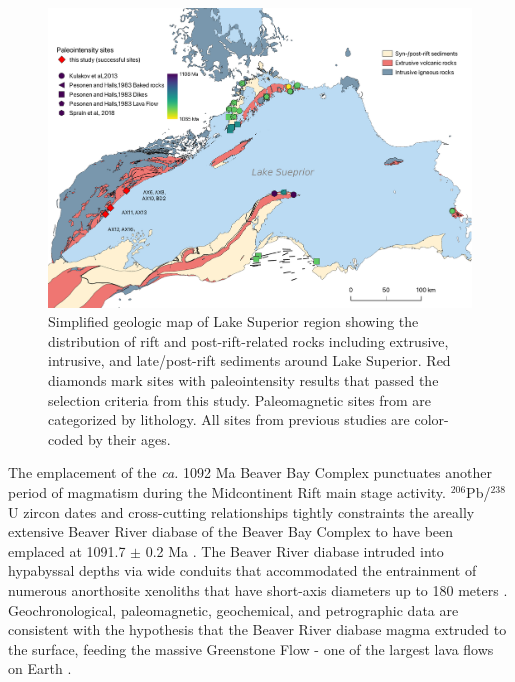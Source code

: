 \documentclass[draft]{agujournal2019}
\begin{document}
\begin{figure}
\centering
\noindent\includegraphics[width=\textwidth]{Geologic_map.pdf}
\caption{\footnotesize{Simplified geologic map of Lake Superior region showing the distribution of rift and post-rift-related rocks including extrusive, intrusive, and late/post-rift sediments around Lake Superior. Red diamonds mark sites with paleointensity results that passed the selection criteria from this study. Paleomagnetic sites from  are categorized by lithology. All sites from previous studies are color-coded by their ages.}}
\label{fig:Geologic_map}
\end{figure}

The emplacement of the \textit{ca.} 1092 Ma Beaver Bay Complex punctuates another period of magmatism during the Midcontinent Rift main stage activity. $^{206}$Pb/$^{238}$U zircon dates and cross-cutting relationships tightly constraints the areally extensive Beaver River diabase of the Beaver Bay Complex to have been emplaced at 1091.7 $\pm$ 0.2 Ma \cite{Zhang2021b}. The Beaver River diabase intruded into hypabyssal depths via wide conduits that accommodated the entrainment of numerous anorthosite xenoliths that have short-axis diameters up to 180 meters \cite{Boerboom2004a, Boerboom2006b}. Geochronological, paleomagnetic, geochemical, and petrographic data are consistent with the hypothesis that the Beaver River diabase magma extruded to the surface, feeding the massive Greenstone Flow - one of the largest lava flows on Earth \cite{Doyle2016a, Zhang2021b}.

\end{document}
